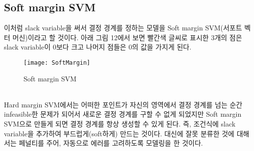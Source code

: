 \documentclass[a4paper]{oblivoir}
\begin{document}
\subsection{Soft margin SVM}
\indent 이처럼 slack variable을 써서 결정 경계를 정하는 모델을 Soft margin SVM(서포트 벡터 머신)이라고 할 것이다. 아래 그림 12에서 보면 빨간색 글씨로 표시한 3개의 점은 slack variable이 0보다 크고 나머지 점들은 0의 값을 가지게 된다.\\
\begin{figure}[ht]\centering
\texttt{[image: SoftMargin]}\caption{Soft margin SVM}\label{Fig:5-12}
\end{figure}\\
\indent Hard margin SVM에서는 어떠한 포인트가 자신의 영역에서 결정 경계를 넘는 순간 infeasible한 문제가 되어서 새로운 결정 경계를 구할 수 없게 되었지만 Soft margin SVM으로 만들게 되면 결정 경계를 항상 생성할 수 있게 된다. 즉, 조건식에 slack variable을 추가하여 부드럽게(soft하게) 만드는 것이다. 대신에 잘못 분류한 것에 대해서는 페널티를 주어, 자동으로 에러를 고려하도록 모델링을 한 것이다.

\end{document}

